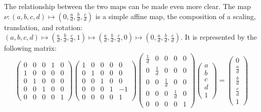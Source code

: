 The relationship between the two maps can be made even more clear.
The map $\nu: (a,b,c,d) \mapsto (0,\frac{a}{d},\frac{b}{d},\frac{c}{d})$
is a simple affine map, the composition of a scaling, translation, 
and rotation: $(a,b,c,d) \mapsto (\frac{a}{d},\frac{b}{d},\frac{c}{d},1)
\mapsto (\frac{a}{d},\frac{b}{d},\frac{c}{d},0)
\mapsto (0,\frac{a}{d},\frac{b}{d},\frac{c}{d})$.
It is represented by the
following matrix:
\[
	\left( \begin{array}{ccccc} 
	0 & 0 & 0 & 1 & 0 \\
	1 & 0 & 0 & 0 & 0 \\
	0 & 1 & 0 & 0 & 0 \\
	0 & 0 & 1 & 0 & 0 \\
	0 & 0 & 0 & 0 & 1
	\end{array} \right) 
	\left( \begin{array}{ccccc} 
	1 & 0 & 0 & 0 & 0 \\
	0 & 1 & 0 & 0 & 0 \\
	0 & 0 & 1 & 0 & 0 \\
	0 & 0 & 0 & 1 & -1 \\
	0 & 0 & 0 & 0 & 1 
	\end{array} \right)
	\left( \begin{array}{ccccc} 
	\frac{1}{d} & 0 & 0 & 0 & 0 \\
	0 & \frac{1}{d} & 0 & 0 & 0 \\
	0 & 0 & \frac{1}{d} & 0 & 0 \\
	0 & 0 & 0 & \frac{1}{d} & 0 \\
	0 & 0 & 0 & 0 & 1
	\end{array} \right)
	\left( \begin{array}{c}
	a \\ b \\ c \\ d \\ 1
	\end{array} \right)	
	= \left( \begin{array}{c}
	0 \\ \frac{a}{d} \\ \frac{b}{d} \\ \frac{c}{d} \\ 1
	\end{array} \right)
\]
